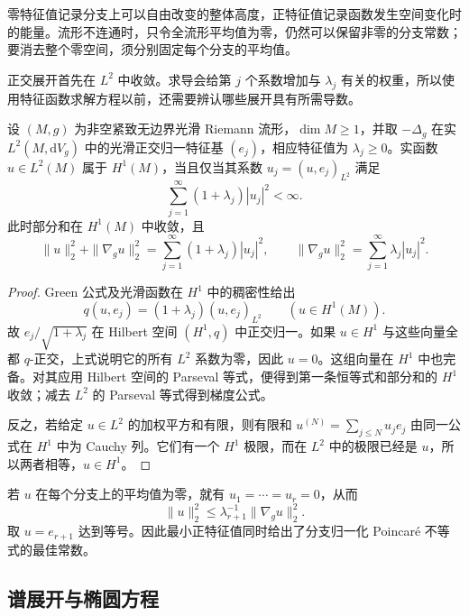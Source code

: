 零特征值记录分支上可以自由改变的整体高度，正特征值记录函数发生空间变化时的能量。流形不连通时，只令全流形平均值为零，仍然可以保留非零的分支常数；要消去整个零空间，须分别固定每个分支的平均值。

\ProseParagraphBreak

正交展开首先在 \(L^2\) 中收敛。求导会给第 \(j\) 个系数增加与 \(\lambda_j\) 有关的权重，所以使用特征函数求解方程以前，还需要辨认哪些展开具有所需导数。

\begin{proposition}[一阶能量的谱表示]\label{b2:prop:26-spectral-form}
设 \((M,g)\) 为非空紧致无边界光滑 Riemann 流形，\(\dim M\geq1\)，并取 \(-\Delta_g\) 在实 \(L^2(M,\mathrm dV_g)\) 中的光滑正交归一特征基 \((e_j)\)，相应特征值为 \(\lambda_j\geq0\)。实函数 \(u\in L^2(M)\) 属于 \(H^1(M)\)，当且仅当其系数 \(u_j=(u,e_j)_{L^2}\) 满足
\[
 \sum_{j=1}^\infty(1+\lambda_j)|u_j|^2<\infty.
\]
此时部分和在 \(H^1(M)\) 中收敛，且
\begin{equation}\label{b2:eq:26-spectral-energy}
 \|u\|_2^2+\|\nabla_g u\|_2^2
       =\sum_{j=1}^\infty(1+\lambda_j)|u_j|^2,
 \qquad
 \|\nabla_g u\|_2^2=\sum_{j=1}^\infty\lambda_j|u_j|^2.
\end{equation}
\end{proposition}
\begin{proof}
Green 公式及光滑函数在 \(H^1\) 中的稠密性给出
\[
 q(u,e_j)=(1+\lambda_j)(u,e_j)_{L^2}\qquad(u\in H^1(M)).
\]
故 \(e_j/\sqrt{1+\lambda_j}\) 在 Hilbert 空间 \((H^1,q)\) 中正交归一。如果 \(u\in H^1\) 与这些向量全都 \(q\)-正交，上式说明它的所有 \(L^2\) 系数为零，因此 \(u=0\)。这组向量在 \(H^1\) 中也完备。对其应用 Hilbert 空间的 Parseval 等式，便得到第一条恒等式和部分和的 \(H^1\) 收敛；减去 \(L^2\) 的 Parseval 等式得到梯度公式。

反之，若给定 \(u\in L^2\) 的加权平方和有限，则有限和 \(u^{(N)}=\sum_{j\leq N}u_je_j\) 由同一公式在 \(H^1\) 中为 Cauchy 列。它们有一个 \(H^1\) 极限，而在 \(L^2\) 中的极限已经是 \(u\)，所以两者相等，\(u\in H^1\)。
\end{proof}

若 \(u\) 在每个分支上的平均值为零，就有 \(u_1=\cdots=u_r=0\)，从而
\[
 \|u\|_2^2\leq\lambda_{r+1}^{-1}\|\nabla_g u\|_2^2.
\]
取 \(u=e_{r+1}\) 达到等号。因此最小正特征值同时给出了分支归一化 Poincaré 不等式的最佳常数。

\subsection{谱展开与椭圆方程}
\label{b2:subsec:260503}

